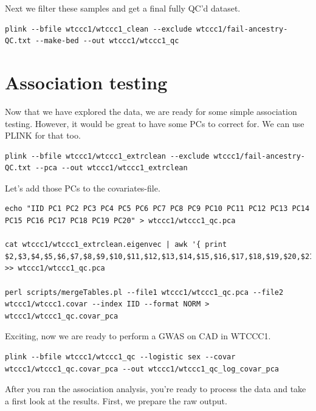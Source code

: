 \documentclass[
]{book}
\begin{document}
Next we filter these samples and get a final fully QC'd dataset.

\begin{verbatim}
plink --bfile wtccc1/wtccc1_clean --exclude wtccc1/fail-ancestry-QC.txt --make-bed --out wtccc1/wtccc1_qc
\end{verbatim}

\hypertarget{association-testing}{%
\section{Association testing}\label{association-testing}}

Now that we have explored the data, we are ready for some simple association testing. However, it would be great to have some PCs to correct for. We can use PLINK for that too.

\begin{verbatim}
plink --bfile wtccc1/wtccc1_extrclean --exclude wtccc1/fail-ancestry-QC.txt --pca --out wtccc1/wtccc1_extrclean
\end{verbatim}

Let's add those PCs to the covariates-file.

\begin{verbatim}
echo "IID PC1 PC2 PC3 PC4 PC5 PC6 PC7 PC8 PC9 PC10 PC11 PC12 PC13 PC14 PC15 PC16 PC17 PC18 PC19 PC20" > wtccc1/wtccc1_qc.pca

cat wtccc1/wtccc1_extrclean.eigenvec | awk '{ print $2,$3,$4,$5,$6,$7,$8,$9,$10,$11,$12,$13,$14,$15,$16,$17,$18,$19,$20,$21,$22}' >> wtccc1/wtccc1_qc.pca

perl scripts/mergeTables.pl --file1 wtccc1/wtccc1_qc.pca --file2 wtccc1/wtccc1.covar --index IID --format NORM > wtccc1/wtccc1_qc.covar_pca
\end{verbatim}

Exciting, now we are ready to perform a GWAS on CAD in WTCCC1.

\begin{verbatim}
plink --bfile wtccc1/wtccc1_qc --logistic sex --covar wtccc1/wtccc1_qc.covar_pca --out wtccc1/wtccc1_qc_log_covar_pca
\end{verbatim}

After you ran the association analysis, you're ready to process the data and take a first look at the results. First, we prepare the raw output.
\end{document}

